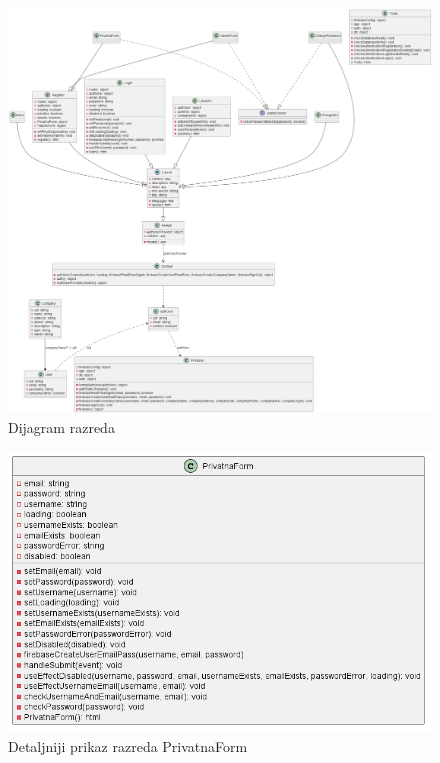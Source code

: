             \begin{figure}[H]
			\includegraphics[scale=0.25]{slike/DijagramRazreda_partial.png}
			\centering
			\caption{Dijagram razreda}
			\label{fig:promjene}
		          \end{figure}

            \begin{figure}[H]
			\includegraphics[scale=0.6]{slike/PrivatnaForm.png}
			\centering
			\caption{Detaljniji prikaz razreda PrivatnaForm}
			\label{fig:promjene}
		          \end{figure}

